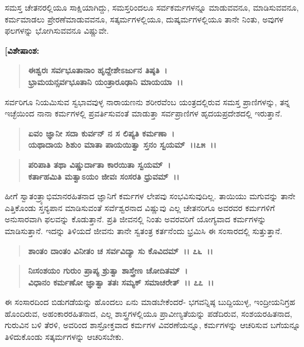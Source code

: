 ಸಮಸ್ತ ಚೇತನರಲ್ಲಿಯೂ ಸಾಕ್ಷಿಯಾಗಿದ್ದು, ಸಮಸ್ತರಿಂದಲೂ ಸರ್ವಕರ್ಮಗಳನ್ನೂ ಮಾಡುವವನೂ, ಮಾಡಿಸುವವನೂ, ಕರ್ಮಮಾಡಲು ಪ್ರೇರಣೆಮಾಡುವವನೂ, ಸತ್ಕರ್ಮಗಳಲ್ಲಿಯೂ, ದುಷ್ಕರ್ಮಗಳಲ್ಲಿಯೂ ತಾನೇ ನಿಂತು, ಅವುಗಳ ಫಲಗಳನ್ನು ಭೋಗಿಸುವವನೂ ವಿಷ್ಣುವೇ.

\begin{flushleft}
\textbf{[ವಿಶೇಷಾಂಶ:} 
\end{flushleft}

\begin{verse}
\textbf{ಈಶ್ವರಃ ಸರ್ವಭೂತಾನಾಂ ಹೃದ್ದೇಶೇಽರ್ಜುನ ತಿಷ್ಠತಿ~।}\\\textbf{ಭ್ರಾಮಯನ್ಸರ್ವಭೂತಾನಿ ಯಂತ್ರಾರೂಢಾನಿ ಮಾಯಯಾ~।।} 
\end{verse}

ಸರ್ವರಿಗೂ ನಿಯಮಿಸುವ ಸ್ವಭಾವವುಳ್ಳ ನಾರಾಯಣನು ಶರೀರವೆಂಬ ಯಂತ್ರದಲ್ಲಿರುವ ಸಮಸ್ತ ಪ್ರಾಣಿಗಳನ್ನು, ತನ್ನ ಇಚ್ಛೆಯಿಂದ ನಾನಾ ಕರ್ಮಗಳಲ್ಲಿ ಪ್ರವರ್ತಿಸುವಂತೆ ಮಾಡುತ್ತಾ ಸರ್ವಪ್ರಾಣಿಗಳ ಹೃದಯಪ್ರದೇಶದಲ್ಲಿ ಇರುತ್ತಾನೆ.

\begin{verse}
\textbf{ಏವಂ ಜ್ಞಾನೀ ಸದಾ ಕುರ್ವನ್ ನ ಸ ಲಿಪ್ಯತಿ ಕರ್ಮಣಾ~।}\\\textbf{ಯಥಾದಾಯ ಶಿಶುಂ ಮಾತಾ ಪಾಯಯಿತ್ವಾ ಸ್ತನಂ ಸ್ವಯಮ್~।।೭೫~।। }
\end{verse}

\begin{verse}
\textbf{ಪರಿಪಾತಿ ತಥಾ ವಿಷ್ಣುರ್ದಾತಾ ಕಾರಯಿತಾ ಸ್ವಯಮ್~।}\\\textbf{ಕರ್ತಾಹಮಿತಿ ಮತ್ವಾಽಯಂ ಜೀವಃ ಸಂಸರತಿ ಧ್ರುವಮ್~।।}
\end{verse}

ಹೀಗೆ ಸ್ವಾತಂತ್ರ್ಯಾಭಿಮಾನರಹಿತನಾದ ಜ್ಞಾನಿಗೆ ಕರ್ಮಗಳ ಲೇಪವು ಸಂಭವಿಸುವುದಿಲ್ಲ. ತಾಯಿಯು ಮಗುವನ್ನು ತಾನೇ ಎತ್ತಿಕೊಂಡು ಸ್ತನ್ಯಪಾನ ಮಾಡಿಸುವಂತೆ ಸರ್ವೆಶ್ವರನಾದ ವಿಷ್ಣುವು ಎಲ್ಲ ಚೇತನರಿಗೂ ಅವರವರ ಕರ್ಮಗಳಿಗೆ ಅನುಸಾರವಾಗಿ ಫಲವನ್ನು ಕೊಡುತ್ತಾನೆ. ಪ್ರತಿ ಜೀವನಲ್ಲಿ ನಿಂತು ಅವರವರಿಗೆ ಯೋಗ್ಯವಾದ ಕರ್ಮಗಳನ್ನು ಮಾಡಿಸುತ್ತಾನೆ. ಇದನ್ನು ತಿಳಿಯದೆ ಜೀವನು ತಾನೇ ಸ್ವತಂತ್ರ ಕರ್ತನೆಂದು ಭ್ರಮಿಸಿ ಈ ಸಂಸಾರದಲ್ಲಿ ಸುತ್ತುತ್ತಾನೆ.

\begin{verse}
\textbf{ಶಾಂತಂ ದಾಂತಂ ವಿನೀತಂ ಚ ಸರ್ವವಿದ್ಯಾ ಸು ಕೊವಿದಮ್~।। ೭೬~।।} 
\end{verse}

\begin{verse}
\textbf{ನಿಃಸಂಶಯಂ ಗುರುಂ ಪ್ರಾಪ್ಯ ಶ್ರುತ್ವಾ ಶಾಸ್ತ್ರೇಣ ಚೋದಿತಮ್~।}\\\textbf{ವಿಧಾನಂ ಕರ್ಮಣೋ ಜ್ಞಾತ್ವಾ ತತಃ ಸಮ್ಯಕ್ ಸಮಾಚರೇತ್~।। ೭೭~।।}
\end{verse}

ಈ ಸಂಸಾರದಿಂದ ಬಿಡುಗಡೆಯನ್ನು ಹೊಂದಲು ಏನು ಮಾಡಬೇಕೆಂದರೆ- ಭಗವನ್ನಿಷ್ಠ ಬುದ್ದಿಯುಳ್ಳ, ಇಂದ್ರೀಯನಿಗ್ರಹ ಹೊಂದಿರುವ, ಅಹಂಕಾರರಹಿತನಾದ, ಎಲ್ಲ ಶಾಸ್ತ್ರಗಳಲ್ಲಿಯೂ ಪ್ರಾವೀಣ್ಯತೆಯನ್ನು ಪಡೆದಿರುವ, ಸಂಶಯರಹಿತನಾದ, ಗುರುವಿನ ಬಳಿ ತೆರಳಿ, ಅವರಿಂದ ಶಾಸ್ರೋಕ್ತವಾದ ಕರ್ಮಗಳ ವಿವರಣೆಯನ್ನೂ, ಕರ್ಮಗಳನ್ನು ಆಚರಿಸುವ ಬಗೆಯನ್ನೂ ತಿಳಿದುಕೊಂಡು ಸತ್ಕರ್ಮಗಳನ್ನು ಆಚರಿಸಬೇಕು.

